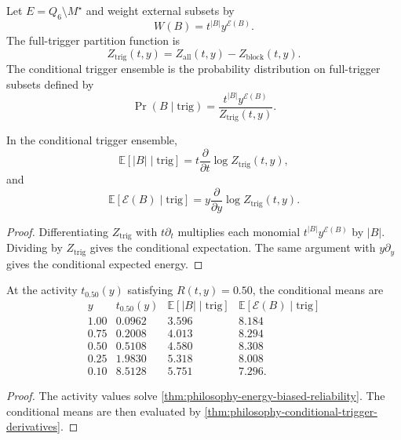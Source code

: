 \begin{definition}
\label{def:philosophy-conditional-trigger-ensemble}
Let $E=Q_{6}\setminus M^{\star}$ and weight external subsets by
$$
  W(B)=t^{|B|}y^{\mathcal{E}(B)}.
$$
The full-trigger partition function is
$$
  Z_{\mathrm{trig}}(t,y)
  =
  Z_{\mathrm{all}}(t,y)-Z_{\mathrm{block}}(t,y).
$$
The conditional trigger ensemble is the probability distribution on
full-trigger subsets defined by
$$
  \Pr(B\mid\mathrm{trig})
  =
  \frac{t^{|B|}y^{\mathcal{E}(B)}}{Z_{\mathrm{trig}}(t,y)}.
$$
\end{definition}

\begin{theorem}
\label{thm:philosophy-conditional-trigger-derivatives}
In the conditional trigger ensemble,
$$
  \mathbb{E}[|B|\mid\mathrm{trig}]
  =
  t\frac{\partial}{\partial t}\log Z_{\mathrm{trig}}(t,y),
$$
and
$$
  \mathbb{E}[\mathcal{E}(B)\mid\mathrm{trig}]
  =
  y\frac{\partial}{\partial y}\log Z_{\mathrm{trig}}(t,y).
$$
\end{theorem}
\begin{proof}
Differentiating $Z_{\mathrm{trig}}$ with $t\partial_{t}$ multiplies
each monomial $t^{|B|}y^{\mathcal{E}(B)}$ by $|B|$. Dividing by
$Z_{\mathrm{trig}}$ gives the conditional expectation. The same
argument with $y\partial_{y}$ gives the conditional expected energy.
\end{proof}

\begin{theorem}
\label{thm:philosophy-conditional-means-half-reliability}
At the activity $t_{0.50}(y)$ satisfying $R(t,y)=0.50$, the conditional
means are
$$
\begin{array}{c|r|r|r}
  y & t_{0.50}(y) & \mathbb{E}[|B|\mid\mathrm{trig}] &
  \mathbb{E}[\mathcal{E}(B)\mid\mathrm{trig}]\\
  \hline
  1.00 & 0.0962 & 3.596 & 8.184\\
  0.75 & 0.2008 & 4.013 & 8.294\\
  0.50 & 0.5108 & 4.580 & 8.308\\
  0.25 & 1.9830 & 5.318 & 8.008\\
  0.10 & 8.5128 & 5.751 & 7.296.
\end{array}
$$
\end{theorem}
\begin{proof}
The activity values solve
\autoref{thm:philosophy-energy-biased-reliability}. The conditional
means are then evaluated by
\autoref{thm:philosophy-conditional-trigger-derivatives}.
\end{proof}

